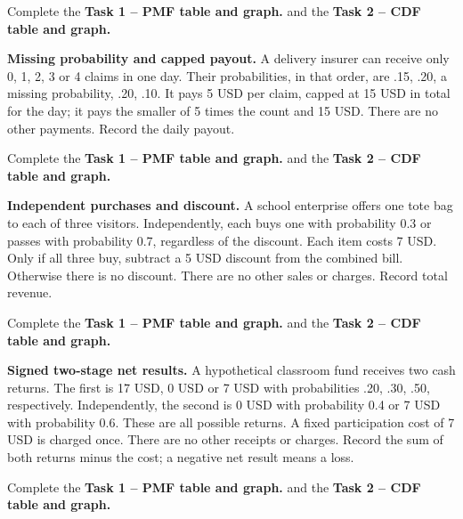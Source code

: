 Complete the \textbf{Task 1 -- PMF table and graph.} and the \textbf{Task 2 -- CDF table and graph.}

\textbf{Missing probability and capped payout.} A delivery insurer can receive only 0, 1, 2, 3 or 4 claims in
one day. Their probabilities, in that order, are .15, .20, a missing probability, .20, .10. It pays 5 USD per
claim, capped at 15 USD in total for the day; it pays the smaller of 5 times the count and 15 USD. There are
no other payments. Record the daily payout.

Complete the \textbf{Task 1 -- PMF table and graph.} and the \textbf{Task 2 -- CDF table and graph.}

\textbf{Independent purchases and discount.} A school enterprise offers one tote bag to each of three
visitors. Independently, each buys one with probability 0.3 or passes with probability 0.7, regardless of the
discount. Each item costs 7 USD. Only if all three buy, subtract a 5 USD discount from the combined bill.
Otherwise there is no discount. There are no other sales or charges. Record total revenue.

Complete the \textbf{Task 1 -- PMF table and graph.} and the \textbf{Task 2 -- CDF table and graph.}


\textbf{Signed two-stage net results.} A hypothetical classroom fund receives two cash returns. The first is
17 USD, 0 USD or 7 USD with probabilities .20, .30, .50, respectively. Independently, the second is 0 USD with
probability 0.4 or 7 USD with probability 0.6. These are all possible returns. A fixed participation cost of 7
USD is charged once. There are no other receipts or charges. Record the sum of both returns minus the cost; a
negative net result means a loss.

Complete the \textbf{Task 1 -- PMF table and graph.} and the \textbf{Task 2 -- CDF table and graph.}


\begingroup
\small
\setlength{\parskip}{3pt}
\setlength{\tabcolsep}{3pt}
\setlength{\extrarowheight}{0pt}
\renewcommand{\arraystretch}{1}

